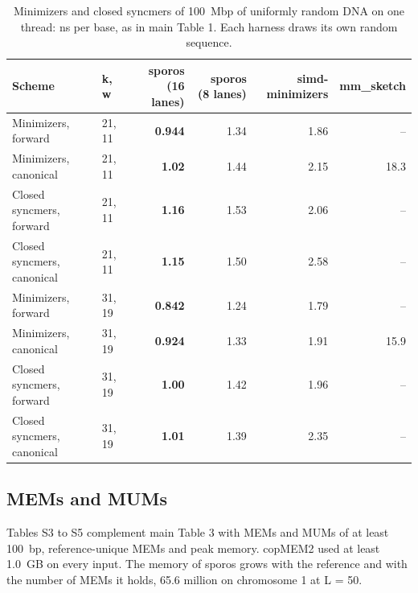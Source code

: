 \documentclass[10pt]{article}
\begin{document}
\begin{table}[H]
\caption{Minimizers and closed syncmers of 100~Mbp of uniformly random DNA on one thread: ns per base, as in main Table 1. Each harness draws its own random sequence.}\label{tab:seeds_random}
\centering\footnotesize
\setlength{\tabcolsep}{4pt}
\begin{tabular}{@{}llrrrr@{}}
\toprule
Scheme & k, w & sporos (16 lanes) & sporos (8 lanes) & simd-minimizers & mm\_sketch \\
\midrule
Minimizers, forward & 21, 11 & \textbf{0.944} & 1.34 & 1.86 & -- \\
Minimizers, canonical & 21, 11 & \textbf{1.02} & 1.44 & 2.15 & 18.3 \\
Closed syncmers, forward & 21, 11 & \textbf{1.16} & 1.53 & 2.06 & -- \\
Closed syncmers, canonical & 21, 11 & \textbf{1.15} & 1.50 & 2.58 & -- \\
Minimizers, forward & 31, 19 & \textbf{0.842} & 1.24 & 1.79 & -- \\
Minimizers, canonical & 31, 19 & \textbf{0.924} & 1.33 & 1.91 & 15.9 \\
Closed syncmers, forward & 31, 19 & \textbf{1.00} & 1.42 & 1.96 & -- \\
Closed syncmers, canonical & 31, 19 & \textbf{1.01} & 1.39 & 2.35 & -- \\
\bottomrule
\end{tabular}
\end{table}

\subsection{MEMs and MUMs}

Tables S3 to S5 complement main Table 3 with MEMs and MUMs of at least 100~bp, reference-unique MEMs and peak memory. copMEM2 used at least 1.0~GB on every input. The memory of sporos grows with the reference and with the number of MEMs it holds, 65.6 million on chromosome 1 at L = 50.
\end{document}

